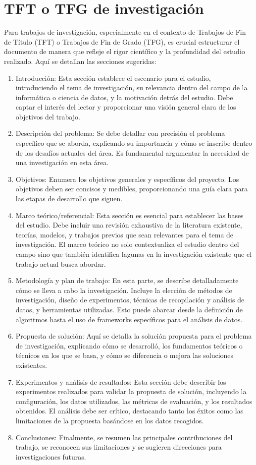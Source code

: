 \chapter{TFT o TFG de investigación}
Para trabajos de investigación, especialmente en el contexto de Trabajos de Fin de Título (TFT) o Trabajos de Fin de Grado (TFG), es crucial estructurar el documento de manera que refleje el rigor científico y la profundidad del estudio realizado. Aquí se detallan las secciones sugeridas: 
\begin{enumerate}
    \item Introducción: Esta sección establece el escenario para el estudio, introduciendo el tema de investigación, su relevancia dentro del campo de la informática o ciencia de datos, y la motivación detrás del estudio. Debe captar el interés del lector y proporcionar una visión general clara de los objetivos del trabajo. 
    \item Descripción del problema: Se debe detallar con precisión el problema específico que se aborda, explicando su importancia y cómo se inscribe dentro de los desafíos actuales del área. Es fundamental argumentar la necesidad de una investigación en esta área.
    \item Objetivos: Enumera los objetivos generales y específicos del proyecto. Los objetivos deben ser concisos y medibles, proporcionando una guía clara para las etapas de desarrollo que siguen.
    \item Marco teórico/referencial: Esta sección es esencial para establecer las bases del estudio. Debe incluir una revisión exhaustiva de la literatura existente, teorías, modelos, y trabajos previos que sean relevantes para el tema de investigación. El marco teórico no solo contextualiza el estudio dentro del campo sino que también identifica lagunas en la investigación existente que el trabajo actual busca abordar. 
    \item Metodología y plan de trabajo: En esta parte, se describe detalladamente cómo se lleva a cabo la investigación. Incluye la elección de métodos de investigación, diseño de experimentos, técnicas de recopilación y análisis de datos, y herramientas utilizadas. Esto puede abarcar desde la definición de algoritmos hasta el uso de frameworks específicos para el análisis de datos. 
    \item Propuesta de solución: Aquí se detalla la solución propuesta para el problema de investigación, explicando cómo se desarrolló, los fundamentos teóricos o técnicos en los que se basa, y cómo se diferencia o mejora las soluciones existentes. 
    \item Experimentos y análisis de resultados: Esta sección debe describir los experimentos realizados para validar la propuesta de solución, incluyendo la configuración, los datos utilizados, las métricas de evaluación, y los resultados obtenidos. El análisis debe ser crítico, destacando tanto los éxitos como las limitaciones de la propuesta basándose en los datos recogidos. 
    \item Conclusiones: Finalmente, se resumen las principales contribuciones del trabajo, se reconocen sus limitaciones y se sugieren direcciones para investigaciones futuras.
\end{enumerate}